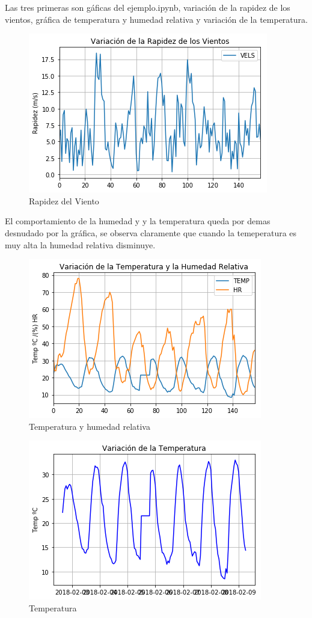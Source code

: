 \documentclass[12pt,a4paper]{article}
\begin{document}
Las tres primeras son gáficas del ejemplo.ipynb, variación de la rapidez de los vientos, gráfica de temperatura y humedad relativa y variación de la temperatura.


\begin{figure}[H]
  \centering
  \includegraphics[scale=0.7]{velocidad_viento.png}
  \caption{Rapidez del Viento}
  \label{fig:RapV}
\end{figure}


El comportamiento de la humedad y y la temperatura queda por demas desnudado por la gráfica, se observa claramente que cuando la temeperatura es muy alta la humedad relativa disminuye.


\begin{figure}[H]
  \centering
  \includegraphics[scale=0.7]{temp_hr.png}
  \caption{Temperatura y humedad relativa}
  \label{fig:TemyHum}
\end{figure}



\begin{figure}[H]
  \centering
  \includegraphics[scale=0.7]{temp.png}
  \caption{Temperatura}
  \label{fig:Tem}
\end{figure}
\end{document}
